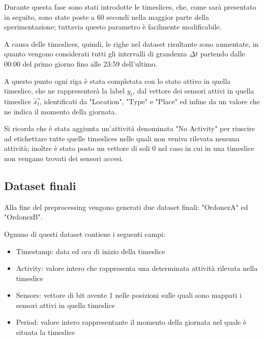 \documentclass[10pt,a4paper]{article}
\begin{document}
	Durante questa fase sono stati introdotte le timeslices, che, come sarà presentato in seguito, sono state poste a 60 secondi nella maggior parte della sperimentazione; tuttavia questo parametro è facilmente modificabile.
	
	A causa delle timeslices, quindi, le righe nel dataset risultante sono aumentate, in quanto vengono considerati tutti gli intervalli di grandezza $ \Delta t $ partendo dalle 00:00 del primo giorno fino alle 23:59 dell'ultimo.
	
	A questo punto ogni riga è stata completata con lo stato attivo in quella timeslice, che ne rappresenterà la label $ y_{t} $, dal vettore dei sensori attivi in quella timeslice $  \vec{x_{t}} $, identificati da "Location", "Type" e "Place" ed infine da un valore che ne indica il momento della giornata.
	
	Si ricorda che è stata aggiunta un'attività denominata "No Activity" per riuscire ad etichettare tutte quelle timeslices nelle quali non veniva rilevata nessuna attività; inoltre è stato posto un vettore di soli 0 nel caso in cui in una timeslice non vengano trovati dei sensori accesi.
	
	\subsection{Dataset finali}
	Alla fine del preprocessing vengono generati due dataset finali: "OrdonezA" ed "OrdonezB".
	
	Ognuno di questi dataset contiene i seguenti campi:
	
	\begin{itemize}
		\item Timestamp: data ed ora di inizio della timeslice
		\item Activity: valore intero che rappresenta una determinata attività rilevata nella timeslice
		\item Sensors: vettore di bit avente 1 nelle posizioni sulle quali sono mappati i sensori attivi in quella timeslice
		\item Period: valore intero rappresentante il momento della giornata nel quale è situata la timeslice
	\end{itemize}
	\clearpage
	
\end{document}

